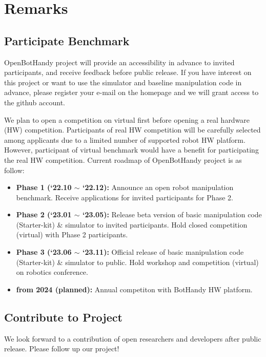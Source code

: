 \chapter{Remarks}
\label{chap:remarks}

\section{Participate Benchmark}

OpenBotHandy project will provide an accessibility in advance to invited participants, and receive feedback before public release.
If you have interest on this project or want to use the simulator and baseline manipulation code in advance,
please register your e-mail on the homepage and we will grant access to the github account.

We plan to open a competition on virtual first before opening a real hardware (HW) competition.
Participants of real HW competition will be carefully selected among applicants due to a limited number of supported robot HW platform.
However, participant of virtual benchmark would have a benefit for participating the real HW competition.
Current roadmap of OpenBotHandy project is as follow:
\begin{itemize}
\item
\textbf{Phase 1 (`22.10 $\sim$ `22.12):}
Announce an open robot manipulation benchmark. Receive applications for invited participants for Phase 2.
\item
\textbf{Phase 2 (`23.01 $\sim$ `23.05):}
Release beta version of basic manipulation code (Starter-kit) \& simulator to invited participants.
Hold closed competition (virtual) with Phase 2 participants.
\item
\textbf{Phase 3 (`23.06 $\sim$ `23.11):}
Official release of basic manipulation code (Starter-kit) \& simulator to public.
Hold workshop and competition (virtual) on robotics conference.
\item
\textbf{from 2024 (planned):}
Annual competiton with BotHandy HW platform.
\end{itemize}


\section{Contribute to Project}

We look forward to a contribution of open researchers and developers after public release.
Please follow up our project!